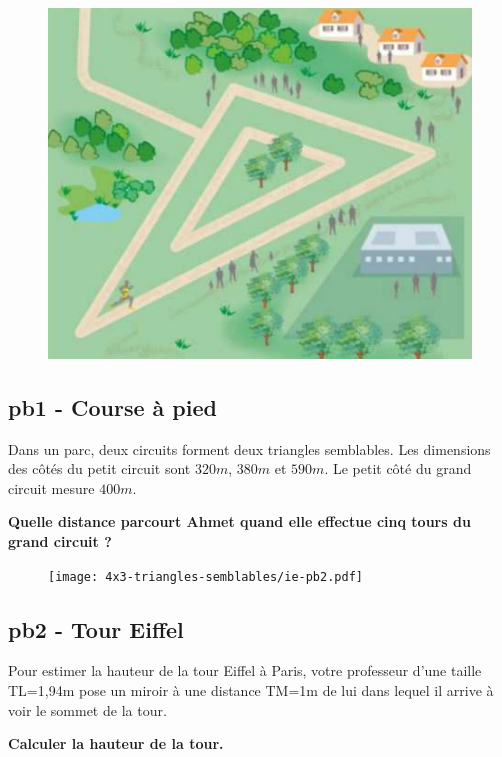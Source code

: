 \begin{minipage}[t]{0.3\textwidth}
  \begin{figure}[H]
    \includegraphics[width=0.7\linewidth]{4x3-triangles-semblables/ie-pb1.png}
  \end{figure}
\end{minipage}
\begin{minipage}[t]{0.65\textwidth}
  \subsection*{pb1 - Course à pied}

  Dans un parc, deux circuits forment deux triangles semblables. Les dimensions des côtés du petit circuit sont $320m$, $380m$ et $590m$. Le petit côté du grand circuit mesure $400 m$.

  \textbf{Quelle distance parcourt Ahmet quand elle effectue cinq tours du grand circuit ?}
\end{minipage}

\horrule{1px}

\begin{minipage}[t]{0.5\textwidth}
  \begin{figure}[H]
    \texttt{[image: 4x3-triangles-semblables/ie-pb2.pdf]}
  \end{figure}
\end{minipage}
\begin{minipage}[t]{0.45\textwidth}
  \subsection*{pb2 - Tour Eiffel}

  Pour estimer la hauteur de la tour Eiffel à Paris, votre professeur d'une taille TL=1,94m pose un miroir à une distance TM=1m de lui dans lequel il arrive à voir le sommet de la tour. 

\textbf{Calculer la hauteur de la tour.}
\end{minipage}

